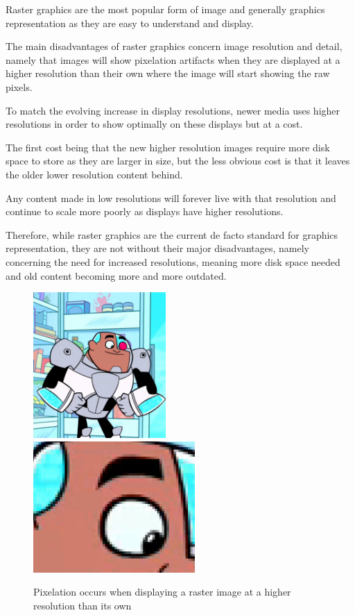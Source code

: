 \documentclass[12pt]{article}
\newcommand{\sentence}{} %
\begin{document}
    \bigskip
    Raster graphics are the most popular form of image and generally graphics representation as they are easy to
    understand and display.
    \sentence
    The main disadvantages of raster graphics concern image resolution and detail, namely that images will show
    pixelation artifacts when they are displayed at a higher resolution than their own where the image will start
    showing the raw pixels.
    \sentence
    To match the evolving increase in display resolutions, newer media uses higher resolutions in order to show
    optimally on these displays but at a cost.
    \sentence
    The first cost being that the new higher resolution images require more disk space to store as they are larger in
    size, but the less obvious cost is that it leaves the older lower resolution content behind.
    \sentence
    Any content made in low resolutions will forever live with that resolution and continue to scale more poorly as
    displays have higher resolutions.
    \sentence
    Therefore, while raster graphics are the current de facto standard for graphics representation, they are not
    without their major disadvantages, namely concerning the need for increased resolutions, meaning more disk space
    needed and old content becoming more and more outdated.
    \bigskip
    \begin{figure}
        \includegraphics[width=0.45\textwidth]{Raster1.png}
        \includegraphics[width=0.55\textwidth]{Raster2.png}
        \caption[Pixelation]{Pixelation occurs when displaying a raster image at a higher resolution than its own}
        \label{fig:pixelation}
    \end{figure}
\end{document}
